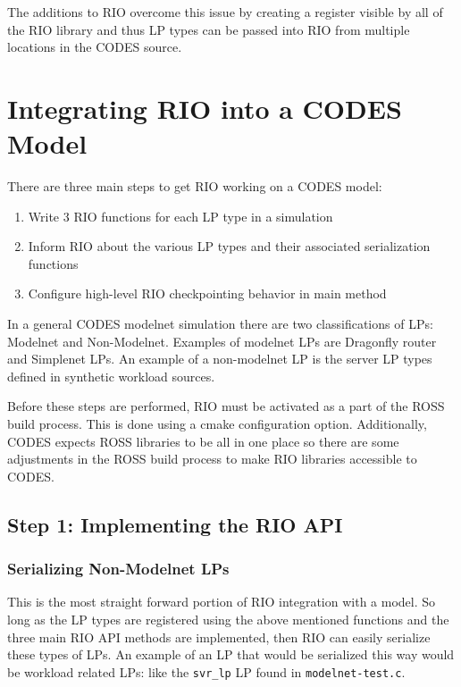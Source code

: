 \documentclass[letterpaper, 11 pt, conference]{IEEEtran}
\begin{document}
The additions to RIO overcome this issue by creating a register visible by all of the RIO library and thus LP types can be passed into RIO from multiple locations in the CODES source. 

\section{Integrating RIO into a CODES Model}
There are three main steps to get RIO working on a CODES model:

\begin{enumerate}
	\item Write 3 RIO functions for each LP type in a simulation \label{step1}
	\item Inform RIO about the various LP types and their associated serialization functions \label{step2}
	\item Configure high-level RIO checkpointing behavior in main method \label{step3}
\end{enumerate}

In a general CODES modelnet simulation there are two classifications of LPs: Modelnet and Non-Modelnet. Examples of modelnet LPs are Dragonfly router and Simplenet LPs. An example of a non-modelnet LP is the server LP types defined in synthetic workload sources.

Before these steps are performed, RIO must be activated as a part of the ROSS build process. This is done using a cmake configuration option. Additionally, CODES expects ROSS libraries to be all in one place so there are some adjustments in the ROSS build process to make RIO libraries accessible to CODES.

\subsection{Step 1: Implementing the RIO API}

\subsubsection{Serializing Non-Modelnet LPs}
This is the most straight forward portion of RIO integration with a model. So long as the LP types are registered using the above mentioned functions and the three main RIO API methods are implemented, then RIO can easily serialize these types of LPs. An example of an LP that would be serialized this way would be workload related LPs: like the \texttt{svr\_lp} LP found in \texttt{modelnet-test.c}.
\end{document}

